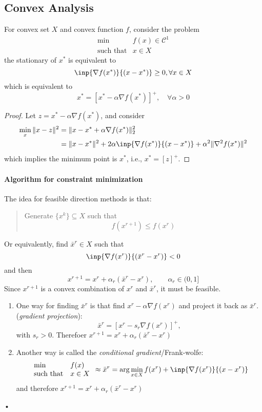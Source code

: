 \subsection{Convex Analysis}
For convex set $X$ and convex function $f$, consider the problem
\[
\begin{array}{ll}
\min&f(x)\in\mathcal{C}^1\\
\mbox{such that}&x\in X
\end{array}
\]
the stationary of $x^*$ is equivalent to
\[
\inp{\nabla f(x^*)}{(x-x^*)}\ge0,\forall x\in X
\]
which is equivalent to
\[
x^*=[x^*-\alpha\nabla f(x^*)]^+,\quad \forall\alpha>0
\]
\begin{proof}
Let $z=x^*-\alpha\nabla f(x^*)$, and consider
\begin{align*}
\min_{x}\|x-z\|^2&=\|x-x^*+\alpha\nabla f(x^*)\|_2^2\\
&=\|x-x^*\|^2+2\alpha\inp{\nabla f(x^*)}{(x-x^*)}+\alpha^2\|\nabla^2f(x^*)\|^2
\end{align*}
which implies the minimum point is $x^*$, i.e., $x^*=[z]^+$.
\end{proof}
\paragraph{Algorithm for constraint minimization}
The idea for feasible direction methods is that:
\begin{quotation}
Generate $\{x^k\}\subseteq X$ such that
\[
f(x^{r+1})\le f(x^r)
\]
\end{quotation}
Or equivalently, find $\bar{x}^r\in X$ such that
\[
\inp{\nabla f(x^r)}{(\bar{x}^r-x^r)}<0
\]
and then
\[
x^{r+1}=x^r+\alpha_r(\bar{x}^r-x^r),\qquad
\alpha_r\in(0,1]
\]
Since $x^{r+1}$ is a convex combination of $x^r$ and $\bar{x}^r$, it must be feasible.
\begin{enumerate}
\item
One way for finding $\bar{x}^r$ is that find $x^r-\alpha\nabla f(x^r)$ and project it back as $\bar{x}^r$. (\emph{gradient projection}):
\[
\bar{x}^r=[x^r-s_r\nabla f(x^r)]^+,
\]
with $s_r>0$. Therefoer $x^{r+1} = x^r + \alpha_r(\bar{x}^r-x^r)$
\item
Another way is called the \emph{conditional gradient}/Frank-wolfe:
\[
\begin{array}{ll}
\min&f(x)\\
\mbox{such that}&x\in X
\end{array}\approx
\bar{x}^r=\arg\min_{x\in X}f(x^r)+\inp{\nabla f(x^r)}{(x-x^r)}
\]
and therefore $x^{r+1}=x^r+\alpha_r(\bar{x}^r-x^r)$


\end{enumerate}•











